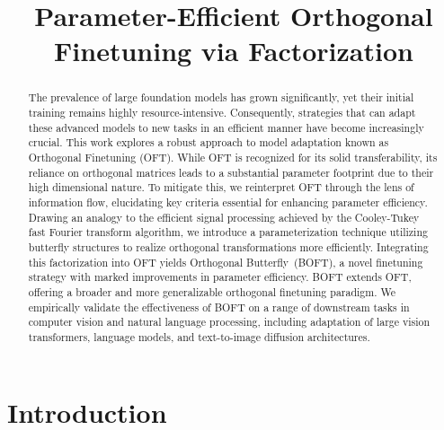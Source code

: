 \title{Parameter-Efficient Orthogonal Finetuning via Factorization}

\begin{abstract}
The prevalence of large foundation models has grown significantly, yet their initial training remains highly resource-intensive. Consequently, strategies that can adapt these advanced models to new tasks in an efficient manner have become increasingly crucial. This work explores a robust approach to model adaptation known as Orthogonal Finetuning (OFT). While OFT is recognized for its solid transferability, its reliance on orthogonal matrices leads to a substantial parameter footprint due to their high dimensional nature. To mitigate this, we reinterpret OFT through the lens of information flow, elucidating key criteria essential for enhancing parameter efficiency. Drawing an analogy to the efficient signal processing achieved by the Cooley-Tukey fast Fourier transform algorithm, we introduce a parameterization technique utilizing butterfly structures to realize orthogonal transformations more efficiently. Integrating this factorization into OFT yields Orthogonal Butterfly~(BOFT), a novel finetuning strategy with marked improvements in parameter efficiency. BOFT extends OFT, offering a broader and more generalizable orthogonal finetuning paradigm. We empirically validate the effectiveness of BOFT on a range of downstream tasks in computer vision and natural language processing, including adaptation of large vision transformers, language models, and text-to-image diffusion architectures.
\end{abstract}

\section{Introduction}

